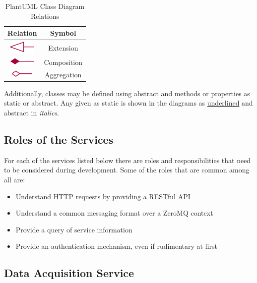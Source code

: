   \begin{table}[H]
    \centering
    \begin{tabular}{c c}
      \toprule
      Relation & Symbol \\ [0.5ex]
      \midrule
      \includegraphics{figures/design/relation-extension} & Extension \\
      \includegraphics{figures/design/relation-composition} & Composition \\
      \includegraphics{figures/design/relation-aggregation} & Aggregation \\
      \bottomrule
    \end{tabular}
    \caption{PlantUML Class Diagram Relations}\label{tab:uml-rel}
  \end{table}

  Additionally, classes may be defined using abstract and methods or properties
  as static or abstract. Any given as static is shown in the diagrams as
  \underline{underlined} and abstract in \emph{italics}.

  \subsection{Roles of the Services}\label{sec:dsg-role}

    For each of the services listed below there are roles and responsibilities
    that need to be considered during development. Some of the roles that are
    common among all are:

    \begin{itemize}
      \item Understand HTTP requests by providing a RESTful API
      \item Understand a common messaging format over a ZeroMQ context
      \item Provide a query of service information
      \item Provide an authentication mechanism, even if rudimentary at first
    \end{itemize}

    \subsection{Data Acquisition Service}\label{sec:dsg-role-daq}

